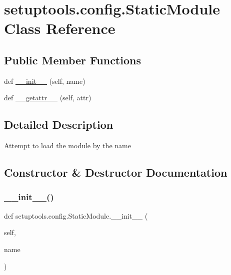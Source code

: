 \hypertarget{classsetuptools_1_1config_1_1StaticModule}{}\section{setuptools.\+config.\+Static\+Module Class Reference}
\label{classsetuptools_1_1config_1_1StaticModule}
\subsection*{Public Member Functions}
\begin{DoxyCompactItemize}
\item 
def \hyperlink{classsetuptools_1_1config_1_1StaticModule_a320b134f4cc8104f70f88c3e21fcdf69}{\+\_\+\+\_\+init\+\_\+\+\_\+} (self, name)
\item 
def \hyperlink{classsetuptools_1_1config_1_1StaticModule_ae4aae1f558bb41fd8adeaeb7b85654f2}{\+\_\+\+\_\+getattr\+\_\+\+\_\+} (self, attr)
\end{DoxyCompactItemize}


\subsection{Detailed Description}
\begin{DoxyVerb}Attempt to load the module by the name
\end{DoxyVerb}
 

\subsection{Constructor \& Destructor Documentation}
\mbox{\label{classsetuptools_1_1config_1_1StaticModule_a320b134f4cc8104f70f88c3e21fcdf69}} 
\subsubsection{\texorpdfstring{\+\_\+\+\_\+init\+\_\+\+\_\+()}{\_\_init\_\_()}}
{\footnotesize\ttfamily def setuptools.\+config.\+Static\+Module.\+\_\+\+\_\+init\+\_\+\+\_\+ (\begin{DoxyParamCaption}\item[{}]{self,  }\item[{}]{name }\end{DoxyParamCaption})}



